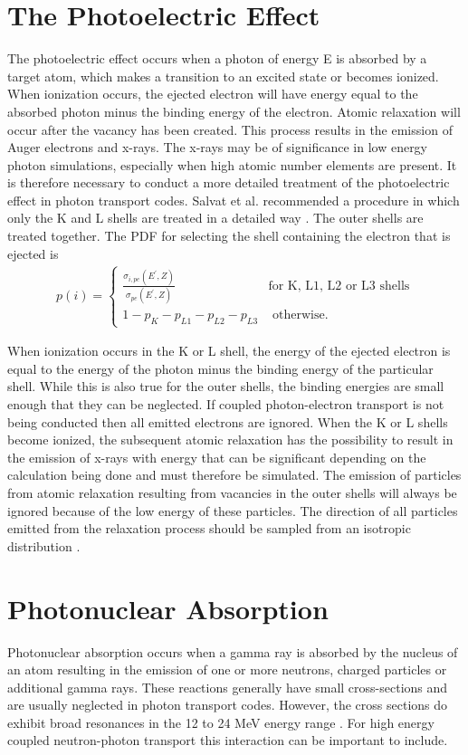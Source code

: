 \section{The Photoelectric Effect}
The photoelectric effect occurs when a photon of energy E is absorbed by a
target atom, which makes a transition to an excited state or becomes ionized.
When ionization occurs, the ejected electron will have energy equal to the 
absorbed photon minus the binding energy of the electron. Atomic relaxation
will occur after the vacancy has been created. This process results in the 
emission of Auger electrons and x-rays. The x-rays may be of significance in
low energy photon simulations, especially when high atomic number elements are
present. It is therefore necessary to conduct a more detailed treatment of the
photoelectric effect in photon transport codes. Salvat et al. recommended a 
procedure in which only the K and L shells are treated in a detailed way
\citep{salvat_physics_2001}. The outer shells are treated together. The PDF
for selecting the shell containing the electron that is ejected is
\begin{align}
  p(i) = 
  \begin{cases}
    \frac{\sigma_{i,pe}(E^{'},Z)}{\sigma_{pe}(E^{'},Z)} & \text{for K, L1, L2 or L3 shells} \\
    1 - p_K - p_{L1} - p_{L2} - p_{L3} & \text{ otherwise}.
  \end{cases}
\end{align}

When ionization occurs in the K or L shell, the energy of the ejected electron
is equal to the energy of the photon minus the binding energy of the particular
shell. While this is also true for the outer shells, the binding energies are
small enough that they can be neglected. If coupled photon-electron transport
is not being conducted then all emitted electrons are ignored. When the K or
L shells become ionized, the subsequent atomic relaxation has the possibility
to result in the emission of x-rays with energy that can be significant
depending on the calculation being done and must therefore be simulated. The
emission of particles from atomic relaxation resulting from vacancies in the
outer shells will always be ignored because of the low energy of these 
particles. The direction of all particles emitted from the relaxation process
should be sampled from an isotropic distribution \citep{salvat_physics_2001}.

\section{Photonuclear Absorption}
Photonuclear absorption occurs when a gamma ray is absorbed by the nucleus of
an atom resulting in the emission of one or more neutrons, charged particles or
additional gamma rays. These reactions generally have small cross-sections
and are usually neglected in photon transport codes. However, the cross sections
do exhibit broad resonances in the 12 to 24 MeV energy range 
\citep{lux_monte_1991}. For high energy coupled neutron-photon transport this
interaction can be important to include. 

